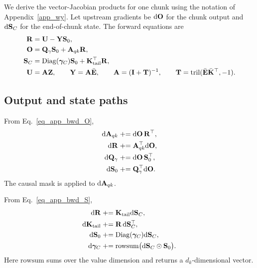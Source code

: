 We derive the vector-Jacobian products for one chunk using the notation of Appendix~\ref{app_wy}. Let upstream gradients be $\mathrm{d}{\mathbf{O}}$ for the chunk output and $\mathrm{d}{\mathbf{S}}_C$ for the end-of-chunk state. The forward equations are
\begin{align}
    {\mathbf{R}} &= {\mathbf{U}}-{\mathbf{Y}}{\mathbf{S}}_0,
\label{eq_app_bwd_R}\\
    {\mathbf{O}} &= {\mathbf{Q}}_{\gamma}{\mathbf{S}}_0+{\mathbf{A}}_{qk}{\mathbf{R}},
\label{eq_app_bwd_O}\\
    {\mathbf{S}}_C &= \operatorname{Diag}(\boldsymbol{\gamma}_C){\mathbf{S}}_0+{\mathbf{K}}_{\mathrm{tail}}^\top{\mathbf{R}},
\label{eq_app_bwd_S}\\
    {\mathbf{U}} &= {\mathbf{A}}{\mathbf{Z}},
    \qquad
    {\mathbf{Y}} = {\mathbf{A}}\bar{{\mathbf{E}}},
    \qquad
    {\mathbf{A}}=({\mathbf{I}}+{\mathbf{T}})^{-1},
    \qquad
    {\mathbf{T}}=\operatorname{tril}(\bar{{\mathbf{E}}}\bar{{\mathbf{K}}}^\top,-1).
\label{eq_app_bwd_core}
\end{align}

\subsection{Output and state paths}
\label{app_bwd_paths}

From Eq.~\ref{eq_app_bwd_O},
\begin{align}
    \mathrm{d}{\mathbf{A}}_{qk}
    &\mathrel{+}=
    \mathrm{d}{\mathbf{O}}\,{\mathbf{R}}^\top,
\label{eq_app_daqk_from_output}\\
    \mathrm{d}{\mathbf{R}}
    &\mathrel{+}=
    {\mathbf{A}}_{qk}^\top\mathrm{d}{\mathbf{O}},
\label{eq_app_dR_from_output}\\
    \mathrm{d}{\mathbf{Q}}_{\gamma}
    &\mathrel{+}=
    \mathrm{d}{\mathbf{O}}\,{\mathbf{S}}_0^\top,
\label{eq_app_dQg_from_output}\\
    \mathrm{d}{\mathbf{S}}_0
    &\mathrel{+}=
    {\mathbf{Q}}_{\gamma}^\top\mathrm{d}{\mathbf{O}} .
\label{eq_app_dS_from_output}
\end{align}
The causal mask is applied to $\mathrm{d}{\mathbf{A}}_{qk}$.

From Eq.~\ref{eq_app_bwd_S},
\begin{align}
    \mathrm{d}{\mathbf{R}}
    &\mathrel{+}=
    {\mathbf{K}}_{\mathrm{tail}}\mathrm{d}{\mathbf{S}}_C,
\label{eq_app_dR_from_state}\\
    \mathrm{d}{\mathbf{K}}_{\mathrm{tail}}
    &\mathrel{+}=
    {\mathbf{R}}\,\mathrm{d}{\mathbf{S}}_C^\top,
\label{eq_app_dKtail_from_state}\\
    \mathrm{d}{\mathbf{S}}_0
    &\mathrel{+}=
    \operatorname{Diag}(\boldsymbol{\gamma}_C)\mathrm{d}{\mathbf{S}}_C,
\label{eq_app_dS_from_state}\\
    \mathrm{d}\boldsymbol{\gamma}_C
    &\mathrel{+}=
    \mathrm{rowsum}\bigl(\mathrm{d}{\mathbf{S}}_C\odot{\mathbf{S}}_0\bigr).
\label{eq_app_dgammaC_from_state}
\end{align}
Here $\mathrm{rowsum}$ sums over the value dimension and returns a $d_k$-dimensional vector.

